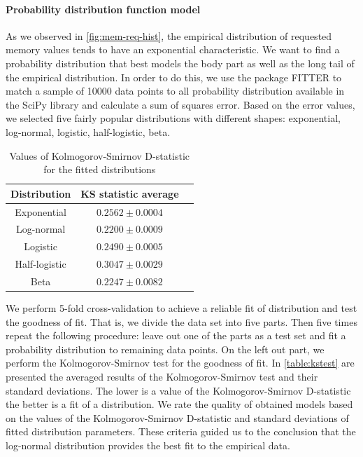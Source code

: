 \documentclass[thesis-en.tex]{subfiles}
\begin{document}
\paragraph{Probability distribution function model}
As we observed in \autoref{fig:mem-req-hist}, the empirical distribution of requested memory values tends to have an exponential characteristic. We want to find a probability distribution that best models the body part as well as the long tail of the empirical distribution. In order to do this, we use the package FITTER \cite{fitter} to match a sample of 10000 data points to all probability distribution available in the SciPy library \cite{2020SciPy-NMeth} and calculate a sum of squares error. Based on the error values, we selected five fairly popular distributions with different shapes: exponential, log-normal, logistic, half-logistic, beta.

\begin{table}[htb]
\centering
\begin{tabular}{ |c|c|c| } 
 \hline
 Distribution & KS statistic average \\ 
 \hline\hline
 Exponential & $0.2562 \pm 0.0004$ \\ 
 \hline
 Log-normal & $0.2200 \pm 0.0009$ \\ 
 \hline
 Logistic & $0.2490 \pm 0.0005$ \\ 
 \hline
 Half-logistic & $0.3047 \pm 0.0029$ \\ 
 \hline
 Beta & $0.2247 \pm 0.0082$ \\ 
 \hline
\end{tabular}
\caption{Values of Kolmogorov-Smirnov D-statistic for the fitted distributions}
\label{table:kstest}
\end{table}

We perform 5-fold cross-validation to achieve a reliable fit of distribution and test the goodness of fit. That is, we divide the data set into five parts. Then five times repeat the following procedure: leave out one of the parts as a test set and fit a probability distribution to remaining data points. On the left out part, we perform the Kolmogorov-Smirnov test for the goodness of fit. In \autoref{table:kstest} are presented the averaged results of the Kolmogorov-Smirnov test and their standard deviations. The lower is a value of the Kolmogorov-Smirnov D-statistic the better is a fit of a distribution.  We rate the quality of obtained models based on the values of the Kolmogorov-Smirnov D-statistic and standard deviations of fitted distribution parameters. These criteria guided us to the conclusion that the log-normal distribution provides the best fit to the empirical data.
\end{document}
